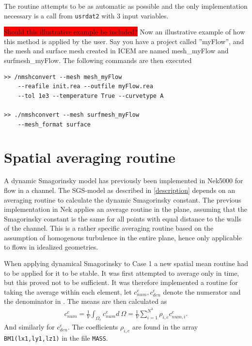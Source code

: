 The routine attempts to be as automatic as possible and the only implementation necessary is 
a call from \verb|usrdat2| with 3 input variables.

\colorbox{red}{Should this illustrative example be included?}
Now an illustrative example of how this method is applied by the user. Say you have a project
called ''myFlow'', and the mesh and surface mesh created in ICEM are named mesh\_myFlow and 
surfmesh\_myFlow. The following commands are then executed

%

% 
\begingroup
\fontsize{12pt}{14pt}
\begin{lstlisting}[escapechar=|,frame=none]
>> /nmshconvert --mesh mesh_myFlow 
    --reafile init.rea --outfile myFlow.rea
    --tol 1e3 --temperature True --curvetype A

>> ./nmshconvert --mesh surfmesh_myFlow 
    --mesh_format surface

\end{lstlisting}
\endgroup
% 
% 
\section{Spatial averaging routine}
A dynamic Smagorinsky model has previously been implemented in Nek5000 for flow in a channel. 
The SGS-model as described in \cref{description} depends on an averaging routine to calculate
the dynamic Smagorinsky constant. The previous implementation in Nek applies an average routine in the plane,
assuming that the Smagorinsky constant is the same for all points with equal distance to the walls 
of the channel. This is a rather specific averaging routine based on the assumption of homogenous turbulence 
in the entire plane, hence only applicable to flows in idealized geometries.

When applying dynamical Smagorinsky to Case 1 a new spatial mean routine had to be applied for it to be stable. 
It was first attempted to average only in time, but this proved not to be sufficient. It was
therefore implemented a routine for taking the average within each element, let 
$c_{num}^e,c_{den}^e$ denote the numerator and the denominator in .
The means are then calculated as 
\begin{align}
    c_{num}^e = \frac{1}{V}\int_{\Omega_e}c_{num}^e d\: \Omega 
    = \frac{1}{V}\sum_{i = 1}^{N^3}\rho_{i,e}c_{num,i}^{e}.
    \label{eq:averageroutine}
\end{align}
And similarly for $c_{den}^e$.
The coefficients $\rho_{i,e}$ are found in the array \verb|BM1(lx1,ly1,lz1)| in the file 
\verb|MASS|.
